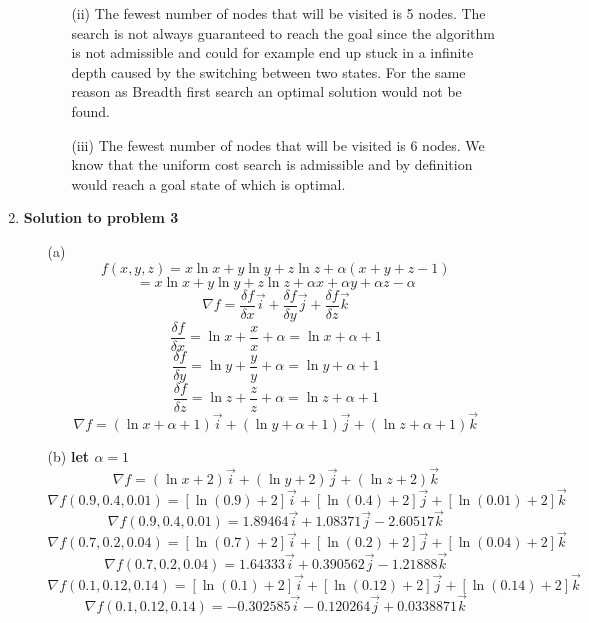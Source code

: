 \begin{enumerate}
\begin{enumerate}
\begin{enumerate}
					\item[(ii)] The fewest number of nodes that will be visited is 5 nodes. The search is not always guaranteed to reach the goal since the algorithm is not admissible and could for example end up stuck in a infinite depth caused by the switching between two states.  For the same reason as Breadth first search an optimal solution would not be found.
					
					\item[(iii)]  The fewest number of nodes that will be visited is 6 nodes.  We know that the uniform cost search is admissible and by definition would reach a goal state of which is optimal.
					
				\end{enumerate}
		\end{enumerate}
		
 	\item {\bf Solution to problem 3}
		\begin{enumerate}
			\item[(a)]  
				\[
				f(x,y,z) = x \ln x + y \ln y + z \ln z + \alpha ( x + y + z - 1)
				\]
				\[
					   = x \ln x + y \ln y + z \ln z + \alpha x + \alpha y + \alpha z - \alpha
				\]
				\[
				\nabla f = \frac{\delta f}{\delta x}\vec{i} + \frac{\delta f}{\delta y}\vec{j} + \frac{\delta f}{\delta z}\vec{k}
				\]
				\[
					\frac{\delta f}{\delta x} = \ln x + \frac{x}{x} + \alpha = \ln x + \alpha + 1
				\]
				\[
					\frac{\delta f}{\delta y} = \ln y + \frac{y}{y} + \alpha = \ln y + \alpha + 1
				\]
				\[
					\frac{\delta f}{\delta z} = \ln z + \frac{z}{z} + \alpha = \ln z + \alpha + 1
				\]
				\[
					\nabla f = (\ln x + \alpha + 1)\vec{i} + (\ln y + \alpha + 1)\vec{j} + (\ln z + \alpha + 1)\vec{k}
				\]
			\item[(b)]
				\bf let \( \alpha = 1 \) 
				\[
					\nabla f = (\ln x + 2)\vec{i} + (\ln y +2)\vec{j} + (\ln z + 2)\vec{k}
				\]
				\vspace*{4mm}
				\[
					\nabla f(0.9,0.4,0.01) = [\ln(0.9) + 2]\vec{i} + [\ln(0.4) + 2]\vec{j} + [\ln(0.01) + 2]\vec{k}
				\]
				\[
					\nabla f(0.9,0.4,0.01) =1.89464\vec{i} + 1.08371\vec{j} - 2.60517\vec{k}
				\]
				\vspace*{4mm}
				\[
					\nabla f(0.7,0.2,0.04) = [\ln(0.7) + 2]\vec{i} + [\ln(0.2) + 2]\vec{j} + [\ln(0.04) + 2]\vec{k}
				\]
				\[
					\nabla f(0.7,0.2,0.04) = 1.64333\vec{i} + 0.390562\vec{j} - 1.21888\vec{k}
				\]
				\vspace*{4mm}
				\[
					\nabla f(0.1,0.12,0.14) = [\ln(0.1) + 2]\vec{i} + [\ln(0.12) + 2]\vec{j} + [\ln(0.14) + 2]\vec{k}
				\]
				\[
					\nabla f(0.1,0.12,0.14) = -0.302585\vec{i} - 0.120264\vec{j} + 0.0338871\vec{k}
				\]
				

\end{enumerate}
\end{enumerate}
